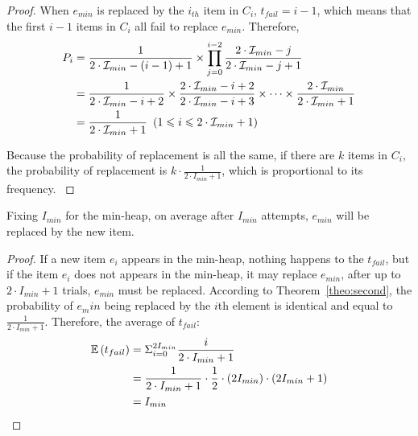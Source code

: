 \begin{proof}
When $e_{min}$ is replaced by the $i_{th}$ item in $C_i$, $t_{fail} = i - 1$, which means that the first $i-1$ items in $C_i$ all fail to replace $e_{min}$.
Therefore, 
\begin{equation}
\begin{aligned}
\centering  
P_i &= \frac{1}{2\cdot\iii_{min}-\left(i-1\right)+1} \times \prod_{j=0}^{i-2} \frac{2\cdot\iii_{min}-j}{2\cdot\iii_{min}-j+1}\\
&= \frac{1}{2\cdot\iii_{min}-i+2} \times \frac{2\cdot\iii_{min}-i+2}{2\cdot\iii_{min}-i+3} \times
\cdots \times \frac{2\cdot\iii_{min}}{2\cdot\iii_{min}+1}\\
&= \frac{1}{2\cdot\iii_{min}+1} \ \left(1 \leqslant i \leqslant 2\cdot\iii_{min}+1\right)
\end{aligned}
\end{equation}

{\color{reviewC}
Because the probability of replacement is all the same, if there are $k$ items in $C_i$, the probability of replacement is $k\cdot \frac{1}{2\cdot I_{min}+1}$, which is proportional to its frequency.
}\end{proof}

{\color{reviewC}
\begin{theorem}
	Fixing $I_{min}$ for the min-heap, on average after $I_{min}$ attempts, $e_{min}$ will be replaced by the new item.
\end{theorem}

\begin{proof}
   If a new item $e_i$ appears in the min-heap, nothing happens to the $t_{fail}$, but if the item $e_i$ does not appears in the min-heap, it may replace $e_{min}$, after up to $2\cdot I_{min}+1$ trials, $e_{min}$ must be replaced. According to Theorem~\ref{theo:second}, the probability of $e_min$ being replaced by the $i$th element is identical and equal to $\frac{1}{2\cdot I_{min}+1}$.
   Therefore, the average of $t_{fail}$:
\begin{equation}
\begin{aligned}
\centering  
\mathbb{E}\left(t_{fail}\right) &= \Sigma_{i=0}^{2I_{min}}{\frac{i}{2\cdot I_{min}+1}} \\
&= \frac{1}{2\cdot I_{min}+1} \cdot \frac{1}{2} \cdot \left({2I_{min}}\right) \cdot \left({2I_{min}+1}\right)\\
&= I_{min}
\end{aligned}
\end{equation}   
\end{proof}

}

